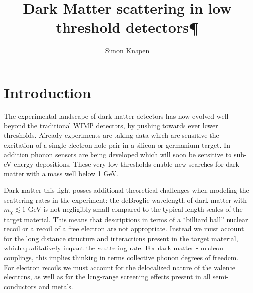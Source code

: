 \documentclass{moriond}
\begin{document}
\vspace*{4cm}
\title{Dark Matter scattering in low threshold detectors¶}


\author{ Simon Knapen }

\address{Lawrence Berkeley National Laboratory, Berkeley, United States, \\
Berkeley Center for Theoretical Physics, UC Berkeley, Berkeley, United States}




\maketitle
{}

\section{Introduction}

The experimental landscape of dark matter detectors has now evolved well beyond the traditional WIMP detectors, by pushing towards ever lower thresholds. Already experiments are taking data which are sensitive the excitation of a single electron-hole pair in a silicon or germanium target.  In addition phonon sensors are being developed which will soon be sensitive to sub-eV energy depositions. These very low thresholds enable new searches for dark matter with a mass well below 1 GeV. 

Dark matter this light posses additional theoretical challenges when modeling the scattering rates in the experiment: the deBroglie wavelength of dark matter with $m_\chi \lesssim 1$ GeV is not negligibly small compared to the typical length scales of the target material. This means that descriptions in terms of a ``billiard ball'' nuclear recoil or a recoil of a free electron are not appropriate. Instead we must account for the long distance structure and interactions present in the target material, which qualitatively impact the scattering rate. For dark matter - nucleon couplings, this implies thinking in terms collective phonon degrees of freedom. For electron recoils we must account for the delocalized nature of the valence electrons, as well as for the long-range screening effects present in all semi-conductors and metals.
\end{document}

